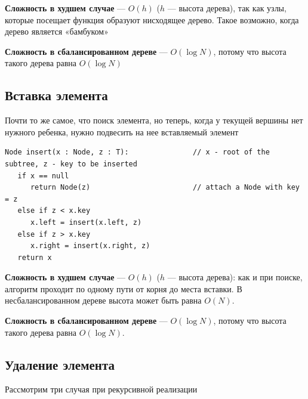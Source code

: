\documentclass[a4paper]{article}
\begin{document}
\textbf{Сложность в худшем случае} — $O(h)$ ($h$ — высота дерева), так как узлы, которые посещает функция образуют нисходящее дерево. Такое возможно, когда дерево является «бамбуком»

\textbf{Сложность в сбалансированном дереве} — $O(\log N)$, потому что высота такого дерева равна $O(\log N)$

\subsection{Вставка элемента}
Почти то же самое, что поиск элемента, но теперь, когда у текущей вершины нет нужного ребенка, нужно подвесить на нее вставляемый элемент

\begin{lstlisting}
Node insert(x : Node, z : T):               // x - root of the subtree, z - key to be inserted
   if x == null 
      return Node(z)                        // attach a Node with key = z
   else if z < x.key
      x.left = insert(x.left, z)
   else if z > x.key
      x.right = insert(x.right, z)
   return x
\end{lstlisting}

\textbf{Сложность в худшем случае} — $O(h)$ ($h$ — высота дерева): как и при поиске, алгоритм проходит по одному пути от корня до места вставки. В несбалансированном дереве высота может быть равна $O(N)$.

\textbf{Сложность в сбалансированном дереве} — $O(\log N)$, потому что высота такого дерева равна $O(\log N)$.

\subsection{Удаление элемента}
Рассмотрим три случая при рекурсивной реализации
\end{document}
